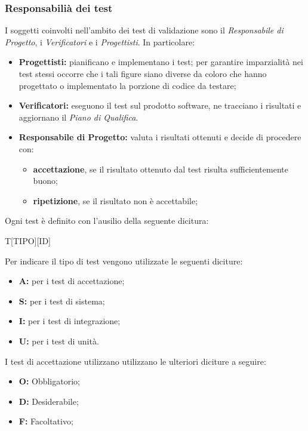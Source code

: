 \subsubsection{Responsabilià dei test}
I soggetti coinvolti nell'ambito dei test di validazione sono il \textit{Responsabile di Progetto}, i
\textit{Verificatori} e i \textit{Progettisti}. In particolare:
\begin{itemize}
    \item \textbf{Progettisti:} pianificano e implementano i test; per garantire imparzialità nei test stessi occorre che
          i tali figure siano diverse da coloro che hanno progettato o implementato la porzione di codice da testare;
    \item \textbf{Verificatori:} eseguono il test sul prodotto software, ne tracciano i risultati e
          aggiornano il \textit{Piano di Qualifica}.
    \item \textbf{Responsabile di Progetto:} valuta i risultati ottenuti e decide di procedere con:
          \begin{itemize}
              \item \textbf{accettazione}, se il risultato ottenuto dal test risulta sufficientemente buono;
              \item \textbf{ripetizione}, se il risultato non è accettabile;
          \end{itemize}
\end{itemize}
\label{Codice test}
Ogni test è definito con l'ausilio della seguente dicitura:\\
\begin{center}
    T[TIPO][ID]
\end{center}
Per indicare il tipo di test vengono utilizzate le seguenti diciture:
\begin{itemize}
    \item \textbf{A:} per i test di accettazione;
    \item \textbf{S:} per i test di sistema;
    \item \textbf{I:} per i test di integrazione;
    \item \textbf{U:} per i test di unità.
\end{itemize}
I test di accettazione utilizzano utilizzano le ulteriori diciture a seguire:
\begin{itemize}
    \item \textbf{O:} Obbligatorio;
    \item \textbf{D:} Desiderabile;
    \item \textbf{F:} Facoltativo;
\end{itemize}
